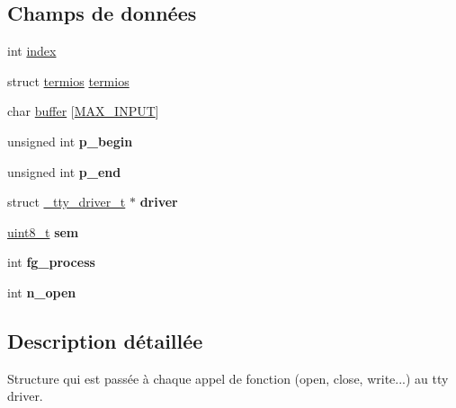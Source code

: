 \subsection*{Champs de données}
\begin{DoxyCompactItemize}
\item 
int \hyperlink{struct__tty__struct__t_a4208e736cfcd8e0b00a3c0bbfe4674f7}{index}
\item 
struct \hyperlink{structtermios}{termios} \hyperlink{struct__tty__struct__t_a39471b82fd4e3a235744e73775ac2523}{termios}
\item 
char \hyperlink{struct__tty__struct__t_ace735f0fca7a2e1c4c75f6ffb9223b19}{buffer} \mbox{[}\hyperlink{tty_8h_a00c1f0e7816626f58349492ef0720b5f}{M\-A\-X\-\_\-\-I\-N\-P\-U\-T}\mbox{]}
\item 
\hypertarget{struct__tty__struct__t_ae136497684ded03f21999f2239b3b67c}{unsigned int {\bfseries p\-\_\-begin}}\label{struct__tty__struct__t_ae136497684ded03f21999f2239b3b67c}

\item 
\hypertarget{struct__tty__struct__t_a437e8f9f913784a7f60cf95af3917b23}{unsigned int {\bfseries p\-\_\-end}}\label{struct__tty__struct__t_a437e8f9f913784a7f60cf95af3917b23}

\item 
\hypertarget{struct__tty__struct__t_a10847c2c12b0a9e131f107ec9dbe65f8}{struct \hyperlink{struct__tty__driver__t}{\-\_\-tty\-\_\-driver\-\_\-t} $\ast$ {\bfseries driver}}\label{struct__tty__struct__t_a10847c2c12b0a9e131f107ec9dbe65f8}

\item 
\hypertarget{struct__tty__struct__t_ac5522c658c4a0e142e85142432fa44fe}{\hyperlink{types_8h_aba7bc1797add20fe3efdf37ced1182c5}{uint8\-\_\-t} {\bfseries sem}}\label{struct__tty__struct__t_ac5522c658c4a0e142e85142432fa44fe}

\item 
\hypertarget{struct__tty__struct__t_ad017c8b00079444a966de0a0d31b1dd7}{int {\bfseries fg\-\_\-process}}\label{struct__tty__struct__t_ad017c8b00079444a966de0a0d31b1dd7}

\item 
\hypertarget{struct__tty__struct__t_a31c54deea3b926404682b196eb366966}{int {\bfseries n\-\_\-open}}\label{struct__tty__struct__t_a31c54deea3b926404682b196eb366966}

\end{DoxyCompactItemize}


\subsection{Description détaillée}
Structure qui est passée à chaque appel de fonction (open, close, write...) au tty driver. 

